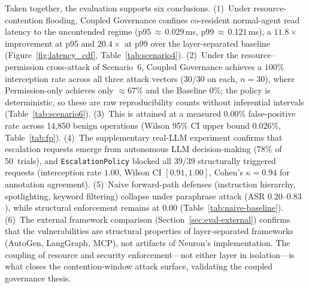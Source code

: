 Taken together, the evaluation supports six conclusions. (1)~Under
resource-contention flooding, Coupled Governance confines co-resident
normal-agent read latency to the uncontended regime (p95\,$\approx$\,0.029\,ms,
p99\,$\approx$\,0.121\,ms), a $11.8\times$ improvement at p95 and $20.4\times$ at
p99 over the layer-separated baseline
(Figure~\ref{fig:latency_cdf}, Table~\ref{tab:scenario4}). (2)~Under the
resource--permission cross-attack of Scenario~6, Coupled Governance achieves a
$100\%$ interception rate across all three attack vectors ($30/30$ on each,
$n=30$), where Permission-only achieves only
$\approx 67\%$ and the Baseline $0\%$; the policy is deterministic, so
these are raw reproducibility counts without inferential intervals
(Table~\ref{tab:scenario6}). (3)~This is attained
at a measured $0.00\%$ false-positive rate across 14{,}850 benign operations
(Wilson 95\% CI upper bound $0.026\%$, Table~\ref{tab:fp}). (4)~The
supplementary real-LLM experiment confirms that escalation requests emerge
from autonomous LLM decision-making (78\% of 50~trials), and
\texttt{EscalationPolicy} blocked all $39/39$ structurally triggered
requests (interception rate $1.00$, Wilson CI $[0.91, 1.00]$, Cohen's
$\kappa = 0.94$ for annotation agreement). (5)~Naive forward-path defenses
(instruction hierarchy, spotlighting, keyword filtering) collapse under
paraphrase attack (ASR $0.20$--$0.83$), while structural enforcement
remains at $0.00$ (Table~\ref{tab:naive-baseline}). (6)~The external
framework comparison (Section~\ref{sec:eval-external}) confirms that the
vulnerabilities are structural properties of layer-separated frameworks
(AutoGen, LangGraph, MCP), not artifacts of Neuron's implementation. The
coupling of resource and security enforcement---not either layer in
isolation---is what closes the contention-window attack surface, validating
the coupled governance thesis.
